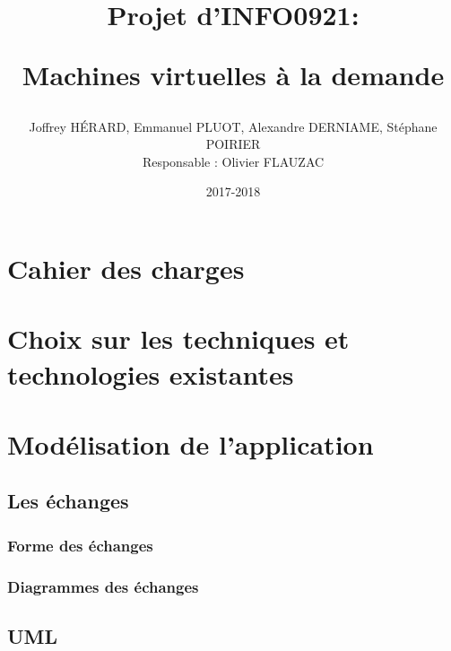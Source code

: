 \documentclass[11pt]{article}
\begin{document}
 \makeatletter
\def\maketitle{%
  \null
  \thispagestyle{empty}%
   \vfill
  \begin{center}\leavevmode
    \normalfont
    {\Huge \@title\par}%
    \vskip 3cm
    {\Large \@author\par}%
    \vskip 1cm
    {\Large \@date\par}%
  \end{center}%
  \vfill
  \null
  \cleardoublepage
  }
\makeatother
\title{\begin{center}Projet d'INFO0921:\end{center} Machines virtuelles à la demande}
\author{ Joffrey HÉRARD, Emmanuel PLUOT, Alexandre DERNIAME, Stéphane POIRIER
\begin{center}Responsable : Olivier FLAUZAC\end{center}}
\date{2017-2018}
\maketitle 
 
\tableofcontents 
\newpage
\section{Cahier des charges}
\newpage
\section{Choix sur les techniques et technologies existantes}
\newpage
\section{Modélisation de l'application}
\subsection{Les échanges}
\subsubsection{Forme des échanges}
\subsubsection{Diagrammes des échanges}
\subsection{UML}
\end{document}
